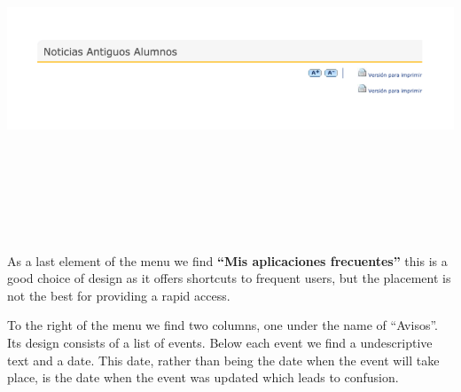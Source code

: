 \documentclass{article}
\begin{document}
\includegraphics[width=15cm, height=10cm, keepaspectratio]{noticiasantiguos}


As a last element of the menu we find \textbf{“Mis aplicaciones frecuentes”} this is a good choice of design as it offers shortcuts to frequent users, but the placement is not the best for providing a rapid access.


To the right of the menu we find two columns, one under the name of “Avisos”. Its design consists of a list of events. Below each event we find a undescriptive text and a date. This date, rather than being the date when the event will take place, is the date when the event was updated which leads to confusion.
\end{document}
